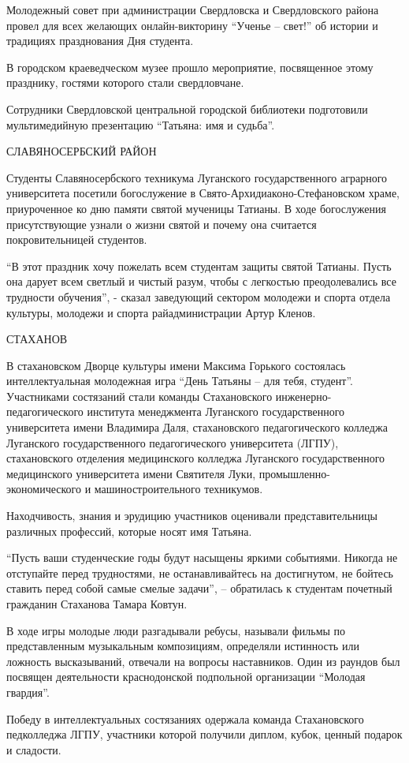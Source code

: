 Молодежный совет при администрации Свердловска и Свердловского района провел
для всех желающих онлайн-викторину \enquote{Ученье – свет!} об истории и традициях
празднования Дня студента.


В городском краеведческом музее прошло мероприятие, посвященное этому
празднику, гостями которого стали свердловчане.  

Сотрудники Свердловской центральной городской библиотеки подготовили
мультимедийную презентацию \enquote{Татьяна: имя и судьба}.

СЛАВЯНОСЕРБСКИЙ РАЙОН

Студенты Славяносербского техникума Луганского государственного аграрного
университета посетили богослужение в Свято-Архидиаконо-Стефановском храме,
приуроченное ко дню памяти святой мученицы Татианы. В ходе богослужения
присутствующие узнали о жизни святой и почему она считается покровительницей
студентов.


\enquote{В этот праздник хочу пожелать всем студентам защиты святой Татианы. Пусть она
дарует всем светлый и чистый разум, чтобы с легкостью преодолевались все
трудности обучения}, - сказал заведующий сектором молодежи и спорта отдела
культуры, молодежи и спорта райадминистрации Артур Кленов. 

СТАХАНОВ

В стахановском Дворце культуры имени Максима Горького состоялась
интеллектуальная молодежная игра \enquote{День Татьяны – для тебя, студент}.
Участниками состязаний стали команды Стахановского инженерно-педагогического
института менеджмента Луганского государственного университета имени Владимира
Даля, стахановского педагогического колледжа Луганского государственного
педагогического университета (ЛГПУ), стахановского отделения медицинского
колледжа Луганского государственного медицинского университета имени Святителя
Луки, промышленно-экономического и машиностроительного техникумов.


Находчивость, знания и эрудицию участников оценивали представительницы
различных профессий, которые носят имя Татьяна.

\enquote{Пусть ваши студенческие годы будут насыщены яркими событиями. Никогда не
отступайте перед трудностями, не останавливайтесь на достигнутом, не бойтесь
ставить перед собой самые смелые задачи}, – обратилась к студентам почетный
гражданин Стаханова Тамара Ковтун.


В ходе игры молодые люди разгадывали ребусы, называли фильмы по представленным
музыкальным композициям, определяли истинность или ложность высказываний,
отвечали на вопросы наставников. Один из раундов был посвящен деятельности
краснодонской подпольной организации \enquote{Молодая гвардия}.

Победу в интеллектуальных состязаниях одержала команда Стахановского
педколледжа ЛГПУ, участники которой получили диплом, кубок, ценный подарок и
сладости.
